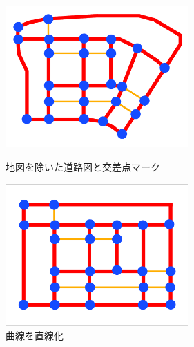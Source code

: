 \begin{figure}[htbp]
    \begin{minipage}{0.5\hsize}
        \begin{center}
            \includegraphics[width=70mm]{assets/MAP_3.eps}
        \end{center}
        \caption{地図を除いた道路図と交差点マーク}
        \label{fig:one}
    \end{minipage}
    \begin{minipage}{0.5\hsize}
        \begin{center}
            \includegraphics[width=70mm]{assets/MAP_4.eps}
        \end{center}
        \caption{曲線を直線化}
        \label{fig:two}
    \end{minipage}
\end{figure}




